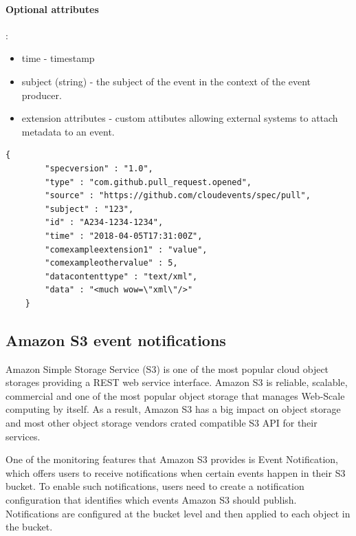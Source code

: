     \paragraph{Optional attributes}:
    \begin{itemize}
        \item time - timestamp
        \item subject (string) - the subject of the event in the context of the event producer.
        \item extension attributes - custom attibutes allowing external systems to attach metadata to an event.
    \end{itemize}

    \begin{lstlisting}[style=jsonStyle, caption=Example of event described using CloudEvents specification and JSON]
    {
        "specversion" : "1.0",
        "type" : "com.github.pull_request.opened",
        "source" : "https://github.com/cloudevents/spec/pull",
        "subject" : "123",
        "id" : "A234-1234-1234",
        "time" : "2018-04-05T17:31:00Z",
        "comexampleextension1" : "value",
        "comexampleothervalue" : 5,
        "datacontenttype" : "text/xml",
        "data" : "<much wow=\"xml\"/>"
    }
    \end{lstlisting}

    \subsection{Amazon S3 event notifications}
    Amazon Simple Storage Service (S3) is one of the most popular cloud object storages providing a REST web service interface. Amazon S3 is reliable, scalable, commercial and one of the most popular object storage that manages Web-Scale computing by itself\cite{eventS3}. As a result, Amazon S3 has a big impact on object storage and most other object storage vendors crated compatible S3 API for their services.

    One of the monitoring features that Amazon S3 provides is Event Notification, which offers users to receive notifications when certain events happen in their S3 bucket. To enable such notifications, users need to create a notification configuration that identifies which events Amazon S3 should publish\cite{eventS3EventNotification}. Notifications are configured at the bucket level and then applied to each object in the bucket.

